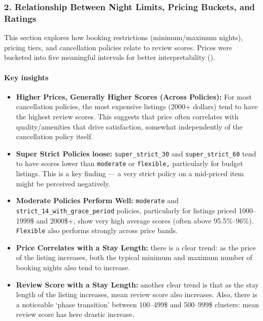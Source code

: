 \subsubsection*{2. Relationship Between Night Limits, Pricing Buckets, and Ratings }

This section explores how booking restrictions (minimum/maximum nights), pricing tiers, and cancellation policies relate to review scores. Prices were bucketed into five meaningful intervals for better interpretability ().

\vspace{0.5em}
\paragraph{Key insights}
\begin{itemize}
    \item \textbf{Higher Prices, Generally Higher Scores (Across Policies):} For most cancellation policies, the most expensive listings (2000+ dollars) tend to have the highest review scores. This suggests that price often correlates with quality/amenities that drive satisfaction, somewhat independently of the cancellation policy itself.
    \item \textbf{Super Strict Policies loose:} \texttt{super\_strict\_30} and \texttt{super\_strict\_60} tend to have scores lower than \texttt{moderate} or \texttt{flexible,} particularly for budget listings. This is a key finding --- a very strict policy on a mid-priced item might be perceived negatively.
    \item \textbf{Moderate Policies Perform Well:} \texttt{moderate} and \texttt{strict\_14\_with\_grace\_period} policies, particularly for listings priced 1000--1999\$ and 2000\$+, show very high average scores (often above 95.5\%--96\%). \texttt{Flexible} also performs strongly across price bands.
    \item \textbf{Price Correlates with a Stay Length:} there is a clear trend: as the price of the listing increases, both the typical minimum and maximum number of booking nights also tend to increase.
    \item \textbf{Review Score with a Stay Length:} another clear trend is that as the stay length of the listing increases, mean review score also increases. Also, there is a noticeable `phase transition' between 100--499\$ and 500--999\$ clusters: mean review score has here drastic increase.
\end{itemize}



